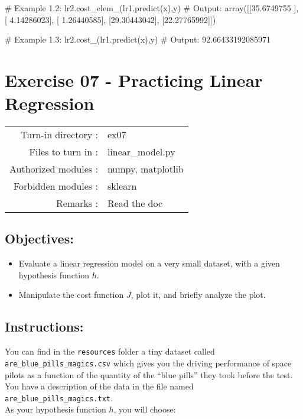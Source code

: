 \documentclass[]{article}
\newenvironment{Shaded}{\begin{snugshade}}{\end{snugshade}}
\newcommand{\CommentTok}[1]{\textcolor[rgb]{0.48,0.49,0.49}{#1}}
\newcommand{\FloatTok}[1]{\textcolor[rgb]{0.96,0.45,0.00}{#1}}
\newcommand{\NormalTok}[1]{\textcolor[rgb]{0.81,0.81,0.76}{#1}}
\begin{document}
\begin{Shaded}
\begin{Highlighting}[]
\CommentTok{# Example 1.2:}
\NormalTok{lr2.cost_elem_(lr1.predict(x),y)}
\CommentTok{# Output:}
\NormalTok{array([[}\FloatTok{35.6749755}\NormalTok{ ],}
\NormalTok{       [ }\FloatTok{4.14286023}\NormalTok{],}
\NormalTok{       [ }\FloatTok{1.26440585}\NormalTok{],}
\NormalTok{       [}\FloatTok{29.30443042}\NormalTok{],}
\NormalTok{       [}\FloatTok{22.27765992}\NormalTok{]])}

\CommentTok{# Example 1.3:}
\NormalTok{lr2.cost_(lr1.predict(x),y)}
\CommentTok{# Output:}
\FloatTok{92.66433192085971}
\end{Highlighting}
\end{Shaded}

\clearpage

\hypertarget{exercise-07---practicing-linear-regression-1}{%
\section{Exercise 07 - Practicing Linear
Regression}\label{exercise-07---practicing-linear-regression-1}}

\begin{longtable}[]{@{}rl@{}}
\toprule
\endhead
Turn-in directory : & ex07\tabularnewline
Files to turn in : & linear\_model.py\tabularnewline
Authorized modules : & numpy, matplotlib\tabularnewline
Forbidden modules : & sklearn\tabularnewline
Remarks : & Read the doc\tabularnewline
\bottomrule
\end{longtable}

\hypertarget{objectives-6}{%
\subsection{Objectives:}\label{objectives-6}}

\begin{itemize}
\item
  Evaluate a linear regression model on a very small dataset, with a
  given hypothesis function \(h\).
\item
  Manipulate the cost function \(J\), plot it, and briefly analyze the
  plot.
\end{itemize}

\hypertarget{instructions-6}{%
\subsection{Instructions:}\label{instructions-6}}

You can find in the \texttt{resources} folder a tiny dataset called
\texttt{are\_blue\_pills\_magics.csv} which gives you the driving
performance of space pilots as a function of the quantity of the ``blue
pills'' they took before the test. You have a description of the data in
the file named \texttt{are\_blue\_pills\_magics.txt}.\\
As your hypothesis function \(h\), you will choose:
\end{document}
